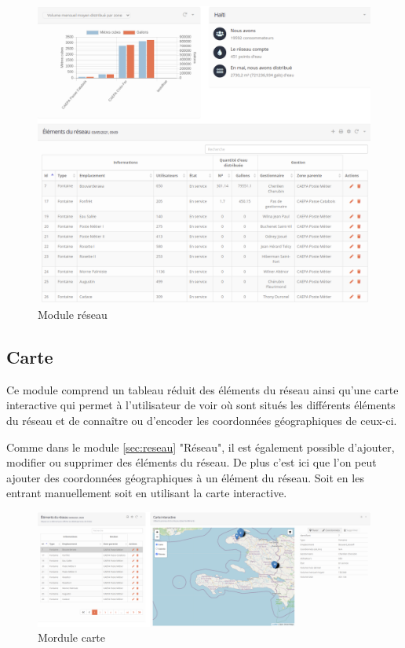 \documentclass{EPL-master-thesis-covers-FR}
\begin{document}
				\begin{figure}[H]
					\centering
					\includegraphics[width=1\textwidth]{images/water_elem}
					\caption{Module réseau}
				\end{figure}
				
\newpage
				
			\subsection{Carte}
				Ce module comprend un tableau réduit des éléments du réseau ainsi qu'une carte interactive qui permet à l'utilisateur de voir où sont situés les différents éléments du réseau et de connaître ou d'encoder les coordonnées géographiques de ceux-ci. 
				
				Comme dans le module \ref{sec:reseau} "Réseau", il est également possible d'ajouter, modifier ou supprimer des éléments du réseau. De plus c'est ici que l'on peut ajouter des coordonnées géographiques à un élément du réseau. Soit en les entrant manuellement soit en utilisant la carte interactive.
				\begin{figure}[H]
					\centering
					\includegraphics[width=1\textwidth]{images/map}
					\caption{Mordule carte}
				\end{figure}
				
\end{document}

